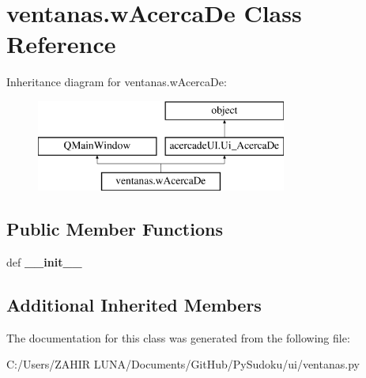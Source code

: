 \hypertarget{classventanas_1_1w_acerca_de}{\section{ventanas.\-w\-Acerca\-De Class Reference}
\label{classventanas_1_1w_acerca_de}
}
Inheritance diagram for ventanas.\-w\-Acerca\-De\-:\begin{figure}[H]
\begin{center}
\leavevmode
\includegraphics[height=3.000000cm]{classventanas_1_1w_acerca_de}
\end{center}
\end{figure}
\subsection*{Public Member Functions}
\begin{DoxyCompactItemize}
\item 
\hypertarget{classventanas_1_1w_acerca_de_ab18d9b92c4620ef50d91072e7d17eee3}{def {\bfseries \-\_\-\-\_\-init\-\_\-\-\_\-}}\label{classventanas_1_1w_acerca_de_ab18d9b92c4620ef50d91072e7d17eee3}

\end{DoxyCompactItemize}
\subsection*{Additional Inherited Members}


The documentation for this class was generated from the following file\-:\begin{DoxyCompactItemize}
\item 
C\-:/\-Users/\-Z\-A\-H\-I\-R  L\-U\-N\-A/\-Documents/\-Git\-Hub/\-Py\-Sudoku/ui/ventanas.\-py\end{DoxyCompactItemize}
